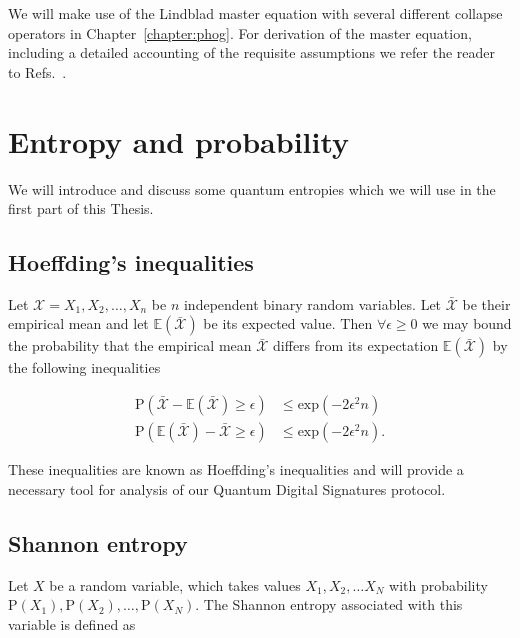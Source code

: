 We will make use of the Lindblad master equation with several different collapse operators in Chapter~\ref{chapter:phog}. For derivation of the master equation, including a detailed accounting of the requisite assumptions we refer the reader to Refs.~\cite{Breuer2002, Carmichael1999}.



\FloatBarrier
\section{Entropy and probability}
We will introduce and discuss some quantum entropies which we will use in the first part of this Thesis.

\FloatBarrier
\subsection{Hoeffding's inequalities}
Let $\mathcal{X} = X_1, X_2, \dots, X_n$ be $n$ independent binary random variables. Let $\bar{\mathcal{X}}$ be their empirical mean  and let $\mathbb{E}\left(\bar{\mathcal{X}}\right)$ be its expected value. Then $\forall \epsilon \ge 0$ we may bound the probability that the empirical mean $\bar{\mathcal{X}}$ differs from its expectation $\mathbb{E}\left(\bar{\mathcal{X}}\right)$ by the following inequalities

\begin{align}
\label{eqn:hoeffding1}
\text{P}\left(\bar{\mathcal{X}} - \mathbb{E}\left(\bar{\mathcal{X}}\right) \ge \epsilon\right) &\le \text{exp}\left(- 2 \epsilon^2 n\right) \\
\label{eqn:hoeffding2}
\text{P}\left(\mathbb{E}\left(\bar{\mathcal{X}}\right) - \bar{\mathcal{X}} \ge \epsilon\right) &\le \text{exp}\left(- 2 \epsilon^2 n\right).
\end{align}





\noindent These inequalities are known as Hoeffding's inequalities  and will provide a necessary tool for analysis of our Quantum Digital Signatures protocol.



\FloatBarrier
\subsection{Shannon entropy}
Let $X$ be a random variable, which takes values $X_1, X_2, \dots X_N$ with probability $\text{P}\left(X_1\right), \text{P}\left(X_2\right),\dots,\text{P}\left(X_N\right)$. The Shannon entropy associated with this variable is defined as 

